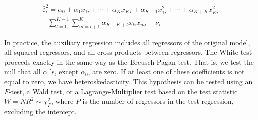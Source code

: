$$
\begin{gathered}
\widehat{\varepsilon}_{i}^{2}=\alpha_{0}+\alpha_{1} x_{1 i}+\cdots+\alpha_{K} x_{K i}+\alpha_{K+1} x_{1 i}^{2}+\cdots+\alpha_{K+K} x_{K i}^{2} \\
+\sum_{l=1}^{K-1} \sum_{m=l+1}^{K} \alpha_{K+K+l} x_{l i} x_{m i}+\nu_{i}
\end{gathered}
$$

In practice, the auxiliary regression includes all regressors of the original model, all squared regressors, and all cross products between regressors. The White test proceeds exactly in the same way as the Breusch-Pagan test. That is, we test the null that all $\alpha$ 's, except $\alpha_{0}$, are zero. If at least one of these coefficients is not equal to zero, we have heteroskedasticity. This hypothesis can be tested using an $F$-test, a Wald test, or a Lagrange-Multiplier test based on the test statistic $W=N R^{2} \sim \chi_{P}^{2}$, where $P$ is the number of regressors in the test regression, excluding the intercept.